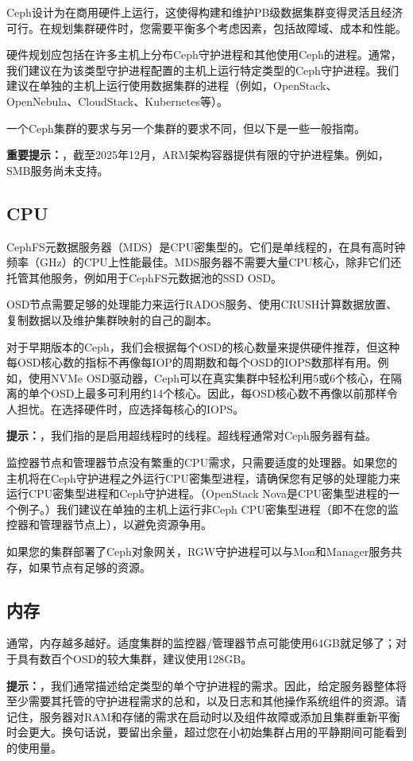 \documentclass[12pt,UTF8]{ctexbook}
\begin{document}
Ceph设计为在商用硬件上运行，这使得构建和维护PB级数据集群变得灵活且经济可行。在规划集群硬件时，您需要平衡多个考虑因素，包括故障域、成本和性能。

硬件规划应包括在许多主机上分布Ceph守护进程和其他使用Ceph的进程。通常，我们建议在为该类型守护进程配置的主机上运行特定类型的Ceph守护进程。我们建议在单独的主机上运行使用数据集群的进程（例如，OpenStack、OpenNebula、CloudStack、Kubernetes等）。

一个Ceph集群的要求与另一个集群的要求不同，但以下是一些一般指南。

\textbf{重要提示：}，截至2025年12月，ARM架构容器提供有限的守护进程集。例如，SMB服务尚未支持。

\subsection{CPU}
CephFS元数据服务器（MDS）是CPU密集型的。它们是单线程的，在具有高时钟频率（GHz）的CPU上性能最佳。MDS服务器不需要大量CPU核心，除非它们还托管其他服务，例如用于CephFS元数据池的SSD OSD。

OSD节点需要足够的处理能力来运行RADOS服务、使用CRUSH计算数据放置、复制数据以及维护集群映射的自己的副本。

对于早期版本的Ceph，我们会根据每个OSD的核心数量来提供硬件推荐，但这种每OSD核心数的指标不再像每IOP的周期数和每个OSD的IOPS数那样有用。例如，使用NVMe OSD驱动器，Ceph可以在真实集群中轻松利用5或6个核心，在隔离的单个OSD上最多可利用约14个核心。因此，每OSD核心数不再像以前那样令人担忧。在选择硬件时，应选择每核心的IOPS。

\textbf{提示：}，我们指的是启用超线程时的线程。超线程通常对Ceph服务器有益。

监控器节点和管理器节点没有繁重的CPU需求，只需要适度的处理器。如果您的主机将在Ceph守护进程之外运行CPU密集型进程，请确保您有足够的处理能力来运行CPU密集型进程和Ceph守护进程。（OpenStack Nova是CPU密集型进程的一个例子。）我们建议在单独的主机上运行非Ceph CPU密集型进程（即不在您的监控器和管理器节点上），以避免资源争用。

如果您的集群部署了Ceph对象网关，RGW守护进程可以与Mon和Manager服务共存，如果节点有足够的资源。

\subsection{内存}
通常，内存越多越好。适度集群的监控器/管理器节点可能使用64GB就足够了；对于具有数百个OSD的较大集群，建议使用128GB。

\textbf{提示：}，我们通常描述给定类型的单个守护进程的需求。因此，给定服务器整体将至少需要其托管的守护进程需求的总和，以及日志和其他操作系统组件的资源。请记住，服务器对RAM和存储的需求在启动时以及组件故障或添加且集群重新平衡时会更大。换句话说，要留出余量，超过您在小初始集群占用的平静期间可能看到的使用量。
\end{document}
